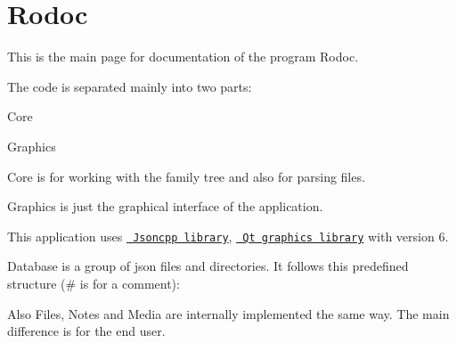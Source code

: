 \chapter{Rodoc}
\hypertarget{index}{}\label{index}
\label{index_md_index}%
%
 This is the main page for documentation of the program Rodoc.

The code is separated mainly into two parts\+:


\begin{DoxyEnumerate}
\item Core
\item Graphics
\end{DoxyEnumerate}

Core is for working with the family tree and also for parsing files.

Graphics is just the graphical interface of the application.

This application uses \href{https://open-source-parsers.github.io/jsoncpp-docs/doxygen/}{\texttt{ Jsoncpp library}}, \href{https://www.qt.io/}{\texttt{ Qt graphics library}} with version 6.

Database is a group of {\ttfamily json} files and directories. It follows this predefined structure ({\ttfamily \#} is for a comment)\+:


\begin{DoxyCode}{0}
\DoxyCodeLine{\ \ \ \ -\/\ [files]}
\DoxyCodeLine{\ \ \ \ -\/\ [file]}
\DoxyCodeLine{\ \ \ \ -\/\ [files]}

\end{DoxyCode}


Also {\ttfamily Files}, {\ttfamily Notes} and {\ttfamily Media} are internally implemented the same way. The main difference is for the end user. 